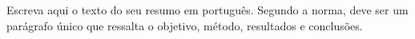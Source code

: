 Escreva aqui o texto do seu resumo em português. Segundo a norma, deve ser um parágrafo único que ressalta o objetivo, método, resultados e conclusões.